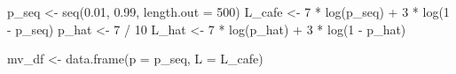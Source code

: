\documentclass[
  letterpaper,
  DIV=11,
  numbers=noendperiod]{scrartcl}
\newenvironment{Shaded}{\begin{snugshade}}{\end{snugshade}}
\newcommand{\AttributeTok}[1]{\textcolor[rgb]{0.40,0.45,0.13}{#1}}
\newcommand{\DecValTok}[1]{\textcolor[rgb]{0.68,0.00,0.00}{#1}}
\newcommand{\FloatTok}[1]{\textcolor[rgb]{0.68,0.00,0.00}{#1}}
\newcommand{\FunctionTok}[1]{\textcolor[rgb]{0.28,0.35,0.67}{#1}}
\newcommand{\NormalTok}[1]{\textcolor[rgb]{0.00,0.23,0.31}{#1}}
\newcommand{\OtherTok}[1]{\textcolor[rgb]{0.00,0.23,0.31}{#1}}
\newcommand{\SpecialCharTok}[1]{\textcolor[rgb]{0.37,0.37,0.37}{#1}}
\begin{document}
\begin{Shaded}
\begin{Highlighting}[]
\NormalTok{p\_seq  }\OtherTok{\textless{}{-}} \FunctionTok{seq}\NormalTok{(}\FloatTok{0.01}\NormalTok{, }\FloatTok{0.99}\NormalTok{, }\AttributeTok{length.out =} \DecValTok{500}\NormalTok{)}
\NormalTok{L\_cafe }\OtherTok{\textless{}{-}} \DecValTok{7} \SpecialCharTok{*} \FunctionTok{log}\NormalTok{(p\_seq) }\SpecialCharTok{+} \DecValTok{3} \SpecialCharTok{*} \FunctionTok{log}\NormalTok{(}\DecValTok{1} \SpecialCharTok{{-}}\NormalTok{ p\_seq)}
\NormalTok{p\_hat  }\OtherTok{\textless{}{-}} \DecValTok{7} \SpecialCharTok{/} \DecValTok{10}
\NormalTok{L\_hat  }\OtherTok{\textless{}{-}} \DecValTok{7} \SpecialCharTok{*} \FunctionTok{log}\NormalTok{(p\_hat) }\SpecialCharTok{+} \DecValTok{3} \SpecialCharTok{*} \FunctionTok{log}\NormalTok{(}\DecValTok{1} \SpecialCharTok{{-}}\NormalTok{ p\_hat)}

\NormalTok{mv\_df  }\OtherTok{\textless{}{-}} \FunctionTok{data.frame}\NormalTok{(}\AttributeTok{p =}\NormalTok{ p\_seq, }\AttributeTok{L =}\NormalTok{ L\_cafe)}


\end{Highlighting}
\end{Shaded}
\end{document}
